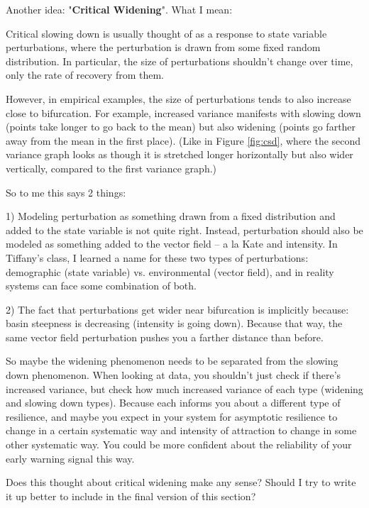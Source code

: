
Another idea: "\textbf{Critical Widening}". What I mean:

Critical slowing down is usually thought of as a response to state variable perturbations, where the perturbation is drawn from some fixed random distribution. In particular, the size of perturbations shouldn't change over time, only the rate of recovery from them. 

However, in empirical examples, the size of perturbations tends to also increase close to bifurcation. For example, increased variance manifests with slowing down (points take longer to go back to the mean) but also widening (points go farther away from the mean in the first place).  (Like in Figure \ref{fig:csd}, where the second variance graph looks as though it is stretched longer horizontally but also wider vertically, compared to the first variance graph.)

So to me this says 2 things:

1) Modeling perturbation as something drawn from a fixed distribution and added to the state variable is not quite right. Instead, perturbation should also be modeled as something added to the vector field -- a la Kate and intensity. In Tiffany's class, I learned a name for these two types of perturbations: demographic (state variable) vs. environmental (vector field), and in reality systems can face some combination of both.

2) The fact that perturbations get wider near bifurcation is implicitly because: basin steepness is decreasing (intensity is going down). Because that way, the same vector field perturbation pushes you a farther distance than before. 

So maybe the widening phenomenon needs to be separated from the slowing down phenomenon. When looking at data, you shouldn't just check if there's increased variance, but check how much increased variance of each type (widening and slowing down types). Because each informs you about a different type of resilience, and maybe you expect in your system for asymptotic resilience to change in a certain systematic way and intensity of attraction to change in some other systematic way. You could be more confident about the reliability of your early warning signal this way.

Does this thought about critical widening make any sense? Should I try to write it up better to include in the final version of this section?


